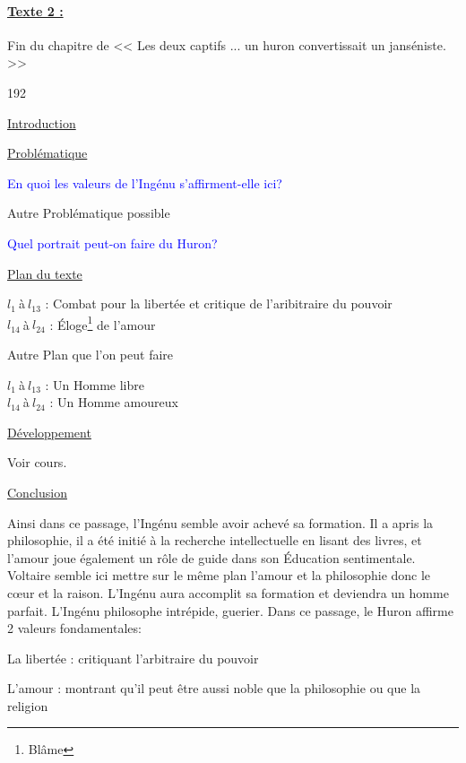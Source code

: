 \documentclass[12pt,a4paper]{article}
\begin{document}
					\paragraph[Texte 2]{\textbf{\underline{Texte 2 : }}}
Fin du chapitre \textsc{} de << Les deux captifs ... un huron convertissait un janséniste. >>
\begin{dingautolist}{192}

\item \underline{Introduction} \par

\item \underline{Probl\'ematique }\par
	\textcolor{blue}{En quoi les valeurs de l'Ingénu s'affirment-elle ici?}\par
	Autre Problématique possible \par
	\textcolor{blue}{Quel portrait peut-on faire du Huron?}


\item \underline{Plan du texte} \par
	$l_{1}~$\`a$~l_{13}$ : Combat pour la libertée et critique de l'aribitraire du pouvoir\\
    $l_{14}~$\`a$~l_{24}$ : \'Eloge\footnote{Blâme} de l'amour \par
Autre Plan que l'on peut faire\par
	$l_{1}~$\`a$~l_{13}$ : Un Homme libre\\
    $l_{14}~$\`a$~l_{24}$ : Un Homme amoureux


\item \underline{D\'eveloppement} \par
        Voir cours.

\item \underline{Conclusion} \par
	Ainsi dans ce passage, l'Ingénu semble avoir achevé sa formation.
	Il a apris la philosophie, il a été initié à la recherche intellectuelle en lisant des livres, et l'amour joue également un rôle de guide dans son \'Education sentimentale. 
	Voltaire semble ici mettre sur le même plan l'amour et la philosophie donc le c\oe ur et la raison.
	L'Ingénu aura accomplit sa formation et deviendra un homme parfait.
	L'Ingénu philosophe intrépide, guerier.
	Dans ce passage, le Huron affirme 2 valeurs fondamentales:\par
	La libertée : critiquant l'arbitraire du pouvoir\par
	L'amour : montrant qu'il peut être aussi noble que la philosophie ou que la religion \par

\end{dingautolist}
 \newpage
\end{document}
